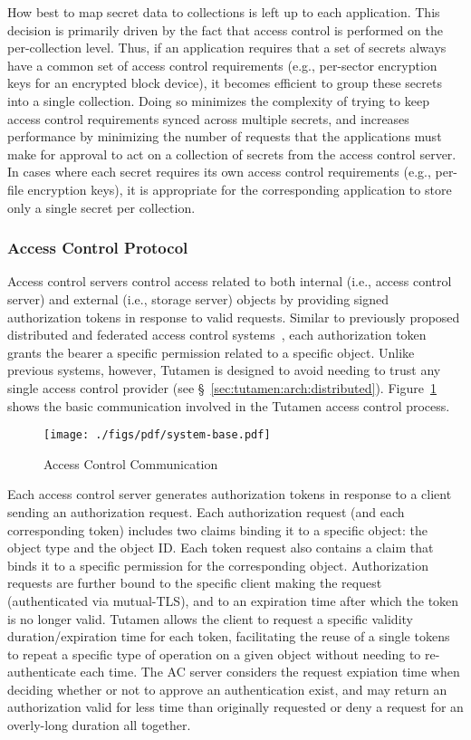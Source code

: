 How best to map secret data to collections is left up to each
application. This decision is primarily driven by the fact that access
control is performed on the per-collection level. Thus, if an
application requires that a set of secrets always have a common set of
access control requirements (e.g., per-sector encryption keys for an
encrypted block device), it becomes efficient to group these secrets
into a single collection. Doing so minimizes the complexity of trying
to keep access control requirements synced across multiple secrets,
and increases performance by minimizing the number of requests that
the applications must make for approval to act on a collection of
secrets from the access control server. In cases where each secret
requires its own access control requirements (e.g., per-file
encryption keys), it is appropriate for the corresponding application
to store only a single secret per collection.

\subsubsection{Access Control Protocol}
\label{sec:tutamen:arch:acp}

Access control servers control access related to both internal (i.e.,
access control server) and external (i.e., storage server) objects by
providing signed authorization tokens in response to valid
requests. Similar to previously proposed distributed and federated
access control systems~\cite{neuman1994, calero2010, leandro2012},
each authorization token grants the bearer a specific permission
related to a specific object. Unlike previous systems, however,
Tutamen is designed to avoid needing to trust any single access
control provider (see \S~\ref{sec:tutamen:arch:distributed}).
Figure~\ref{fig:tutamen:systembase} shows the basic communication
involved in the Tutamen access control process.

\begin{figure}[th]
  \centering
  \texttt{[image: ./figs/pdf/system-base.pdf]}
  \caption{Access Control Communication}
  \label{fig:tutamen:systembase}
\end{figure}

Each access control server generates authorization tokens in response
to a client sending an authorization request. Each authorization
request (and each corresponding token) includes two claims binding it
to a specific object: the object type and the object ID. Each token
request also contains a claim that binds it to a specific permission
for the corresponding object. Authorization requests are further bound
to the specific client making the request (authenticated via
mutual-TLS), and to an expiration time after which the token is no
longer valid. Tutamen allows the client to request a specific validity
duration/expiration time for each token, facilitating the reuse of a
single tokens to repeat a specific type of operation on a given object
without needing to re-authenticate each time. The AC server considers
the request expiation time when deciding whether or not to approve an
authentication exist, and may return an authorization valid for less
time than originally requested or deny a request for an overly-long
duration all together.

